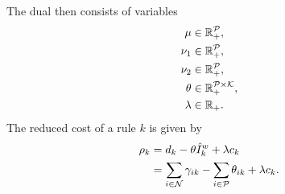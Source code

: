 The dual then consists of variables
\begin{align*}
    \mu &\in \mathbb{R}_+^{\mathcal{P}}, \\
    \nu_1 &\in \mathbb{R}_+^{\mathcal{P}}, \\
    \nu_2 &\in \mathbb{R}_+^{\mathcal{P}}, \\
    \theta &\in \mathbb{R}_+^{\mathcal{P} \times \mathcal{K}}, \\
    \lambda &\in \mathbb{R}_+.
\end{align*}
The reduced cost of a rule $k$ is given by
\begin{equation}\label{eq:NRPa_redcost_vector_derivation}
    \begin{split}
        \rho_k &= d_k - \theta \hat{I}^w_k + \lambda c_k \\
        &= \sum_{i \in \mathcal{N}} \gamma_{ik} - \sum_{i \in \mathcal{P}} \theta_{ik} + \lambda c_k.
    \end{split}
\end{equation}